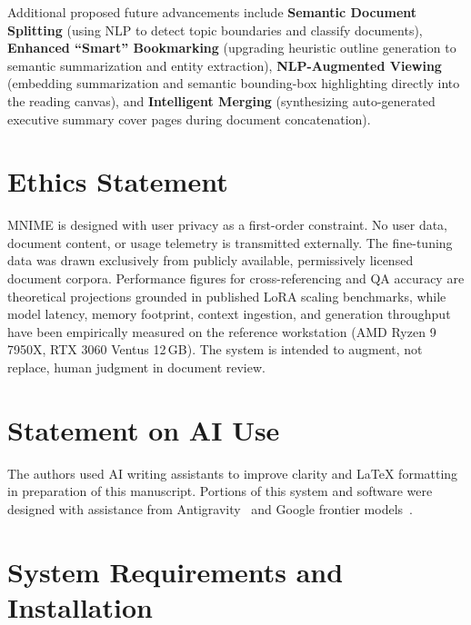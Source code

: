 \documentclass[11pt]{article}
\begin{document}
Additional proposed future advancements include \textbf{Semantic Document Splitting} (using NLP to detect topic boundaries and classify documents), \textbf{Enhanced ``Smart'' Bookmarking} (upgrading heuristic outline generation to semantic summarization and entity extraction), \textbf{NLP-Augmented Viewing} (embedding summarization and semantic bounding-box highlighting directly into the reading canvas), and \textbf{Intelligent Merging} (synthesizing auto-generated executive summary cover pages during document concatenation).

\section*{Ethics Statement}

MNIME is designed with user privacy as a first-order constraint.
No user data, document content, or usage telemetry is transmitted externally.
The fine-tuning data was drawn exclusively from publicly available,
permissively licensed document corpora.
Performance figures for cross-referencing and QA accuracy are theoretical
projections grounded in published LoRA scaling benchmarks, while model latency,
memory footprint, context ingestion, and generation throughput have been empirically
measured on the reference workstation (AMD Ryzen 9 7950X, RTX 3060 Ventus 12\,GB).
The system is intended to augment, not replace, human judgment in document
review.

\section*{Statement on AI Use}

The authors used AI writing assistants to improve clarity and LaTeX
formatting in preparation of this manuscript. Portions of this system and software were designed with assistance from Antigravity~\cite{antigravity2024} and Google frontier models~\cite{gemini31}.

\clearpage
\setlength{\bibsep}{2.5pt}


\appendix
\clearpage
\small

\section{System Requirements and Installation}
\label{app:install}
\end{document}
